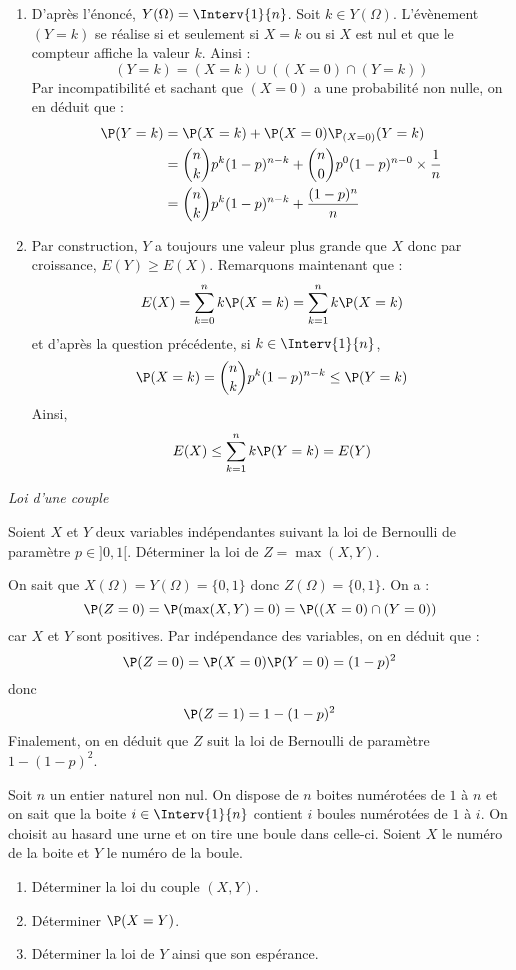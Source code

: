 \documentclass[a4paper,10pt]{report}
\begin{document}
\corr 

\begin{enumerate}
\item D'après l'énoncé, $Y(\Omega) = \Interv{1}{n}$. Soit $k \in Y(\Omega)$. L'évènement $(Y=k)$ se réalise si et seulement si $X=k$ ou si $X$ est nul et que le compteur affiche la valeur $k$. Ainsi :
$$ (Y=k) = (X=k) \cup ((X=0) \cap (Y=k))$$
Par incompatibilité et sachant que $(X=0)$ a une probabilité non nulle, on en déduit que :
\begin{align*}
 \P(Y=k) & = \P(X=k) + \P(X=0) \P_{(X=0)}(Y=k) \\
 & = \binom{n}{k} p^k (1-p)^{n-k} + \binom{n}{0} p^0 (1-p)^{n-0} \times \dfrac{1}{n} \\
 & = \binom{n}{k} p^k (1-p)^{n-k} + \dfrac{(1-p)^n}{n}
 \end{align*}
 \item Par construction, $Y$ a toujours une valeur plus grande que $X$ donc par croissance, $E(Y) \geq E(X)$. Remarquons maintenant que :
 $$ E(X) = \sum_{k=0}^n k \P(X=k) =  \sum_{k=1}^n k \P(X=k)$$
 et d'après la question précédente, si $k \in \Interv{1}{n}$,
 $$ \P(X=k) = \binom{n}{k} p^k (1-p)^{n-k}  \leq \P(Y=k)$$
 Ainsi,
 $$ E(X) \leq \sum_{k=1}^n k \P(Y=k) = E(Y)$$
\end{enumerate}

\medskip

\begin{center}
\textit{{ {\large Loi d'une couple}}}
\end{center}

\medskip

\begin{Exercice}{} Soient $X$ et $Y$ deux variables indépendantes suivant la loi de Bernoulli de paramètre $p \in ]0,1[$. Déterminer la loi de $Z= \max(X,Y)$.
\end{Exercice}

\corr On sait que $X(\Omega) = Y(\Omega) = \lbrace 0,1 \rbrace$ donc $Z(\Omega) = \lbrace 0,1 \rbrace$. On a :
$$ \P(Z=0) = \P(\max(X,Y)=0) = \P((X=0) \cap (Y=0))$$
car $X$ et $Y$ sont positives. Par indépendance des variables, on en déduit que :
$$ \P(Z=0) = \P(X=0) \P(Y=0) = (1-p)^2$$
donc 
$$ \P(Z=1) = 1- (1-p)^2$$
Finalement, on en déduit que $Z$ suit la loi de Bernoulli de paramètre $1-(1-p)^2$.

\begin{Exercice}{} Soit $n$ un entier naturel non nul. On dispose de $n$ boites numérotées de $1$ à $n$ et on sait que la boite $i \in \Interv{1}{n}$ contient $i$ boules numérotées de $1$ à $i$. On choisit au hasard une urne et on tire une boule dans celle-ci. Soient $X$ le numéro de la boite et $Y$ le numéro de la boule. 

\begin{enumerate}
\item Déterminer la loi du couple $(X,Y)$.
\item Déterminer $\P(X=Y)$.
\item Déterminer la loi de $Y$ ainsi que son espérance.
\end{enumerate}
\end{Exercice}
\end{document}

